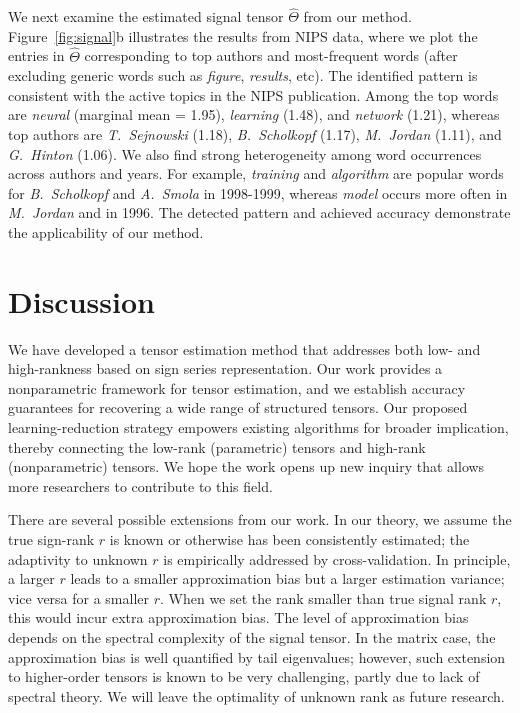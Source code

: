 \documentclass[twoside,11pt]{article}
\theoremstyle{definition}
\begin{document}
We next examine the estimated signal tensor $\hat \Theta$ from our method.  Figure~\ref{fig:signal}b illustrates the results from NIPS data, where we plot the entries in $\hat \Theta$ corresponding to top authors and most-frequent words (after excluding generic words such as \emph{figure}, \emph{results}, etc). The identified pattern is consistent with the active topics in the NIPS publication. Among the top words are \emph{neural} (marginal mean = 1.95), \emph{learning} (1.48), and \emph{network} (1.21), whereas top authors are \emph{T.\ Sejnowski} (1.18), \emph{B.~Scholkopf} (1.17), \emph{M.\ Jordan} (1.11), and \emph{G.\ Hinton} (1.06). We also find strong heterogeneity among word occurrences across authors and years. For example, \emph{training} and \emph{algorithm} are popular words for \emph{B.\ Scholkopf} and \emph{A.\ Smola} in 1998-1999, whereas \emph{model} occurs more often in \emph{M.\ Jordan} and in 1996. The detected pattern and achieved accuracy demonstrate the applicability of our method.




\section{Discussion}\label{sec:conclusion}
We have developed a tensor estimation method that addresses both low- and high-rankness based on
sign series representation. Our work provides a nonparametric framework for tensor estimation, and
we establish accuracy guarantees for recovering a wide range of structured tensors. Our proposed
learning-reduction strategy empowers existing algorithms for broader implication, thereby connecting
the low-rank (parametric) tensors and high-rank (nonparametric) tensors. We hope the work opens up
new inquiry that allows more researchers to contribute to this field.


There are several possible extensions from our work. In our theory, we assume the true sign-rank $r$ is known or otherwise has been consistently estimated; the adaptivity to unknown $r$ is empirically addressed by cross-validation. In principle, a larger $r$ leads to a smaller approximation bias but a larger estimation variance; vice versa for a smaller $r$. When we set the rank smaller than true signal rank $r$, this would incur extra approximation bias. The level of approximation bias depends on the spectral complexity of the signal tensor. In the matrix case, the approximation bias is well quantified by tail eigenvalues; however, such extension to higher-order tensors is known to be very challenging, partly due to lack of spectral theory. We will leave the optimality of unknown rank as future research.
\end{document}
